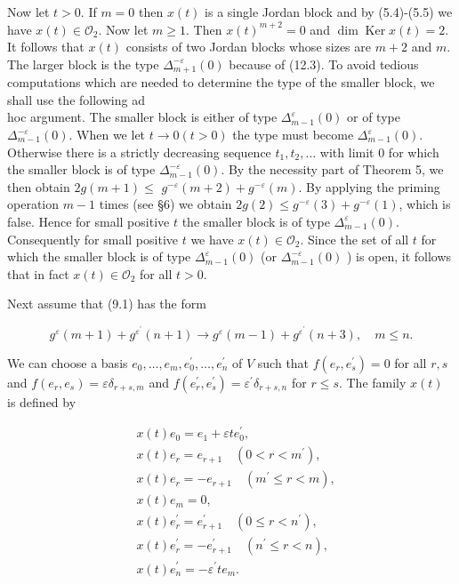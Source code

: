 \documentclass[10pt]{article}
\begin{document}
Now let $t>0$. If $m=0$ then $x(t)$ is a single Jordan block and by (5.4)-(5.5) we have $x(t) \in \mathcal{O}_{2}$. Now let $m \geqslant 1$. Then $x(t)^{m+2}=0$ and $\operatorname{dim} \operatorname{Ker} x(t)=2$. It follows that $x(t)$ consists of two Jordan blocks whose sizes are $m+2$ and $m$. The larger block is the type $\Delta_{m+1}^{-\varepsilon}(0)$ because of (12.3). To avoid tedious computations which are needed to determine the type of the smaller block, we shall use the following ad\\
hoc argument. The smaller block is either of type $\Delta_{m-1}^{\varepsilon}(0)$ or of type $\Delta_{m-1}^{-\varepsilon}(0)$. When we let $t \rightarrow 0(t>0)$ the type must become $\Delta_{m-1}^{\varepsilon}(0)$. Otherwise there is a strictly decreasing sequence $t_{1}, t_{2}, \ldots$ with limit 0 for which the smaller block is of type $\Delta_{m-1}^{-\varepsilon}(0)$. By the necessity part of Theorem 5, we then obtain $2 g(m+1) \leqslant$ $g^{-\varepsilon}(m+2)+g^{-\varepsilon}(m)$. By applying the priming operation $m-1$ times (see §6) we obtain $2 g(2) \leqslant g^{-\varepsilon}(3)+g^{-\varepsilon}(1)$, which is false. Hence for small positive $t$ the smaller block is of type $\Delta_{m-1}^{\varepsilon}(0)$. Consequently for small positive $t$ we have $x(t) \in \mathcal{O}_{2}$. Since the set of all $t$ for which the smaller block is of type $\Delta_{m-1}^{\varepsilon}(0)$ (or $\Delta_{m-1}^{-\varepsilon}(0)$ ) is open, it follows that in fact $x(t) \in \mathcal{O}_{2}$ for all $t>0$.

Next assume that (9.1) has the form


\begin{equation*}
g^{\varepsilon}(m+1)+g^{\varepsilon^{\prime}}(n+1) \rightarrow g^{\varepsilon}(m-1)+g^{\varepsilon^{\prime}}(n+3), \quad m \leqslant n . \tag{12.4}
\end{equation*}


We can choose a basis $e_{0}, \ldots, e_{m}, e_{0}^{\prime}, \ldots, e_{n}^{\prime}$ of $V$ such that $f\left(e_{r}, e_{s}^{\prime}\right)=0$ for all $r, s$ and $f\left(e_{r}, e_{s}\right)=\varepsilon \delta_{r+s, m}$ and $f\left(e_{r}^{\prime}, e_{s}^{\prime}\right)=\varepsilon^{\prime} \delta_{r+s, n}$ for $r \leqslant s$. The family $x(t)$ is defined by

$$
\begin{aligned}
& x(t) e_{0}=e_{1}+\varepsilon t e_{0}^{\prime}, \\
& x(t) e_{r}=e_{r+1} \quad\left(0<r<m^{\prime}\right), \\
& x(t) e_{r}=-e_{r+1} \quad\left(m^{\prime} \leqslant r<m\right), \\
& x(t) e_{m}=0, \\
& x(t) e_{r}^{\prime}=e_{r+1}^{\prime} \quad\left(0 \leqslant r<n^{\prime}\right), \\
& x(t) e_{r}^{\prime}=-e_{r+1}^{\prime} \quad\left(n^{\prime} \leqslant r<n\right), \\
& x(t) e_{n}^{\prime}=-\varepsilon^{\prime} t e_{m} .
\end{aligned}
$$
\end{document}
